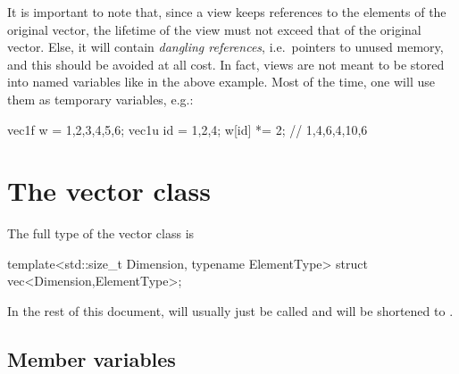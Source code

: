 \documentclass[12pt]{report}
\newenvironment{warning}
{
    \begin{mdframed}[style=warning,frametitle={Warning}]
}
{
    \end{mdframed}
}
\begin{document}
\begin{warning}
It is important to note that, since a view keeps references to the elements of the original vector, the lifetime of the view must not exceed that of the original vector. Else, it will contain \emph{dangling references}, i.e.~pointers to unused memory, and this should be avoided at all cost. In fact, views are not meant to be stored into named variables like in the above example. Most of the time, one will use them as temporary variables, e.g.:
\begin{cppcode}
vec1f w = {1,2,3,4,5,6};
vec1u id = {1,2,4};
w[id] *= 2; // {1,4,6,4,10,6}
\end{cppcode}
\end{warning}

\section{The vector class \label{SEC:core:vec}}

The full type of the vector class is
\begin{cppcode}
template<std::size_t Dimension, typename ElementType>
struct vec<Dimension,ElementType>;
\end{cppcode}

In the rest of this document,  will usually just be called  and  will be shortened to .

\subsection{Member variables \label{SEC:core:vec:member_var}}
\end{document}
